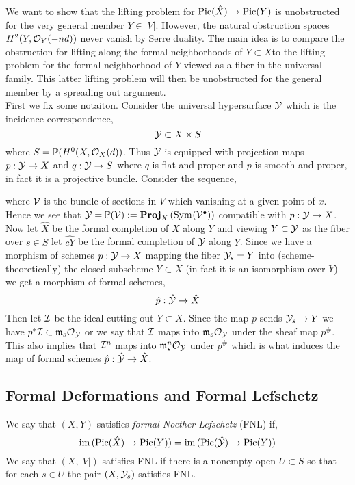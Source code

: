 \documentclass[12pt]{article}
\begin{document}
We want to show that the lifting problem for $\mathrm{Pic}(\hat{X}) \to \mathrm{Pic}(Y)$ is unobstructed for the very general member $Y \in |V|$. However, the natural obstruction spaces $H^2(Y, \mathcal{O}_{Y}(-nd))$ never vanish by Serre duality. The main idea is to compare the obstruction for lifting along the formal neighborhoods of $Y \subset X$to the lifting problem for the formal neighborhood of $Y$ viewed as a fiber in the universal family. This latter lifting problem will then be unobstructed for the general member by a spreading out argument. 
\bigskip\\
First we fix some notaiton. Consider the universal hypersurface $\mathcal{Y}$ which is the incidence correspondence,
\[ \mathcal{Y} \subset X \times S \]
where $S = \mathbb{P}(H^0(X, \mathcal{O}_{X}(d))$. Thus $\mathcal{Y}$ is equipped with projection maps $p : \mathcal{Y} \to X$ and $q : \mathcal{Y} \to S$ where $q$ is flat and proper and $p$ is smooth and proper, in fact it is a projective bundle. Consider the sequence,
\begin{center}
\end{center}
where $\mathcal{V}$ is the bundle of sections in $V$ which vanishing at a given point of $x$. Hence we see that $\mathcal{Y} = \mathbb{P}(\mathcal{V}) := \mathbf{Proj}_{X}\left( \mathrm{Sym}_{}\! \left( \mathcal{V}^\bullet \right) \right)$ compatible with $p : \mathcal{Y} \to X$. Now let $\hat{X}$ be the formal completion of $X$ along $Y$ and viewing $Y \subset \mathcal{Y}$ as the fiber over $s \in S$ let $\hat{cY}$ be the formal completion of $\mathcal{Y}$ along $Y$. Since we have a morphism of schemes $p : \mathcal{Y} \to X$ mapping the fiber $\mathcal{Y}_s = Y$ into (scheme-theoretically) the closed subscheme $Y \subset X$ (in fact it is an isomorphism over $Y$) we get a morphism of formal schemes,
\[ \hat{p} : \hat{\mathcal{Y}} \to \hat{X} \]
Then let $\mathcal{I}$ be the ideal cutting out $Y \subset X$. Since the map $p$ sends $\mathcal{Y}_s \to Y$ we have $p^* \mathcal{I} \subset \mathfrak{m}_s \mathcal{O}_{\mathcal{Y}}$ or we say that $\mathcal{I}$ maps into $\mathfrak{m}_s \mathcal{O}_{\mathcal{Y}}$ under the sheaf map $p^{\#}$. This also implies that $\mathcal{I}^n$ maps into $\mathfrak{m}_s^n \mathcal{O}_{\mathcal{Y}}$ under $p^{\#}$ which is what induces the map of formal schemes $\hat{p} : \hat{\mathcal{Y}} \to \hat{X}$. 

\subsection{Formal Deformations and Formal Lefschetz}

\begin{defn}
We say that $(X, Y)$ satisfies \textit{formal Noether-Lefschetz} (FNL) if,
\[ \operatorname{\mathrm{im}}{(\mathrm{Pic}(\hat{X}) \to \mathrm{Pic}(Y))} = \operatorname{\mathrm{im}}{(\mathrm{Pic}(\hat{\mathcal{Y}}) \to \mathrm{Pic}(Y))} \]
We say that $(X, |V|)$ satisfies FNL if there is a nonempty open $U \subset S$ so that for each $s \in U$ the pair $(X, \mathcal{Y}_s)$ satisfies FNL.
\end{defn}
\end{document}
